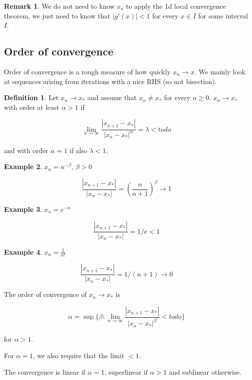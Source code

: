 \documentclass[12pt,a4paper]{article}
\theoremstyle{definition}
\newtheorem{definition}{Definition}[subsection]
\newtheorem{example}[definition]{Example}
\newtheorem*{remark}{Remark}
\begin{document}
\begin{remark}
	We do not need to know $x_{\star}$ to apply the 1d local convergence theorem, we just need to know that $|g'(x)| < 1$ for every $x \in I$ for some interval $I$.
\end{remark}

\subsection{Order of convergence}

Order of convergence is a rough measure of how quickly $x_n \rightarrow x$. We mainly look at sequences arising from iterations with a nice RHS (so not bisection).

\begin{definition}
	Let $x_n \rightarrow x_*$ and assume that $x_n \ne x_*$ for every $n \ge 0$. $x_n \rightarrow x_*$ with order at least $\alpha > 1$ if

	\[\lim_{n \rightarrow \infty} \frac{|x_{n + 1} - x_*|}{|x_n - x_*|^{\alpha}} = \lambda < todo\]

	and with order $\alpha = 1$ if also $\lambda < 1$.
\end{definition}

\begin{example}
	$x_n = n^{-\beta}$, $\beta > 0$

	\[\frac{|x_{n + 1} - x_*|}{|x_n - x_*|} = {(\frac{n}{n + 1})}^{\beta} \rightarrow 1\]
\end{example}

\begin{example}
	$x_n = e^{-n}$

	\[\frac{|x_{n + 1} - x_*|}{|x_n - x_*|} = 1/e < 1\]
\end{example}

\begin{example}
	$x_n = \frac{1}{n!}$

	\[\frac{|x_{n + 1} - x_*|}{|x_n - x_*|} = 1/(n + 1) \rightarrow 0\]
\end{example}

The order of convergence of $x_n \rightarrow x_*$ is

\[\alpha = \sup \{\beta: \lim_{n \rightarrow \infty} \frac{|x_{n + 1} - x_*|}{|x_n - x_*|^{\beta}} < todo\}\]

for $\alpha > 1$.

For $\alpha = 1$, we also require that the limit $< 1$.

The convergence is linear if $\alpha = 1$, superlinear if $\alpha > 1$ and sublinear otherwise.
\end{document}
